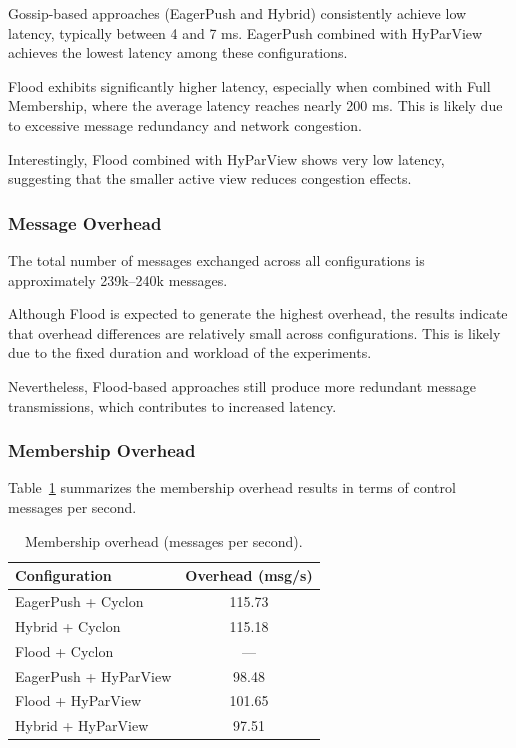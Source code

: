 \documentclass[sigconf,a4paper]{acmart}
\begin{document}
Gossip-based approaches (EagerPush and Hybrid) consistently achieve low
latency, typically between 4 and 7 ms. EagerPush combined with HyParView
achieves the lowest latency among these configurations.

Flood exhibits significantly higher latency, especially when combined
with Full Membership, where the average latency reaches nearly 200 ms.
This is likely due to excessive message redundancy and network congestion.

Interestingly, Flood combined with HyParView shows very low latency,
suggesting that the smaller active view reduces congestion effects.

\subsubsection{Message Overhead}

The total number of messages exchanged across all configurations is
approximately 239k–240k messages.

Although Flood is expected to generate the highest overhead, the results
indicate that overhead differences are relatively small across
configurations. This is likely due to the fixed duration and workload of
the experiments.

Nevertheless, Flood-based approaches still produce more redundant message
transmissions, which contributes to increased latency.

\subsubsection{Membership Overhead}

Table~\ref{tab:membership} summarizes the membership overhead results in
terms of control messages per second.

\begin{table}[h]
\centering
\caption{Membership overhead (messages per second).}
\label{tab:membership}
\begin{tabular}{lc}
\toprule
Configuration & Overhead (msg/s) \\
\midrule
EagerPush + Cyclon & 115.73 \\
Hybrid + Cyclon & 115.18 \\
Flood + Cyclon & --- \\
EagerPush + HyParView & 98.48 \\
Flood + HyParView & 101.65 \\
Hybrid + HyParView & 97.51 \\
\bottomrule
\end{tabular}
\end{table}
\end{document}
